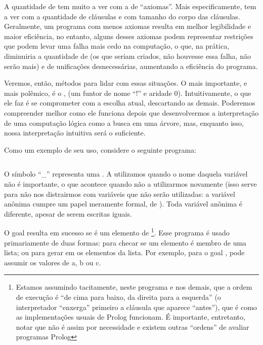 A quantidade de  tem muito a ver com a de ``axiomas''. Mais especificamente, tem a ver com a quantidade de cláusulas e com tamanho do corpo das cláusulas. Geralmente, um programa com menos axiomas resulta em melhor legibilidade e maior eficiência, no entanto, alguns desses axiomas podem representar restrições que podem levar uma falha mais cedo na computação, o que, na prática, diminuiria a quantidade de  (os que seriam criados, não houvesse essa
falha, não serão mais) e de unificações
desnecessárias, aumentando a eficiência do programa.

Veremos, então, métodos para lidar com essas situações. O mais importante, e mais polêmico, é o
,  (um funtor de nome ``!'' e aridade 0). Intuitivamente, o que ele faz é se comprometer com a escolha atual, descartando as demais. Poderemos compreender melhor como ele funciona depois que desenvolvermos a interpretação de uma computação lógica como a busca em uma árvore, mas, enquanto isso, nossa interpretação intuitiva será o suficiente.

Como um exemplo de seu uso, considere o seguinte programa:

    \begin{listing}
\inputminted{prolog}{../Exemplos/Cap4/prog1_member.pl}
    \end{listing}

O símbolo ``\_'' representa uma . A utilizamos quando o nome daquela variável não é importante, o que acontece quando não a utilizarmos novamente (isso serve para não nos distrairmos com variáveis que não serão utilizadas: a variável anônima cumpre um papel meramente formal, de ). Toda variável anônima é diferente, apesar de serem
escritas iguais.

O goal  resulta em sucesso se  é um elemento de
\footnote{Estamos assumindo tacitamente, neste programa e nos demais, que a ordem de execução é ``de cima para baixo, da direita para a esquerda'' (o interpretador ``enxerga'' primeiro a cláusula que aparece ``antes''), que é como as implementações usuais de Prolog funcionam. É importante, entretanto, notar que não é assim por necessidade e existem outras ``ordens'' de avaliar programas Prolog}. Esse programa é usado primariamente de duas formas: para checar se um elemento é membro de
uma lista; ou para gerar em  os elementos da lista. Por exemplo, para o goal ,  pode assumir os valores de a, b ou c.

